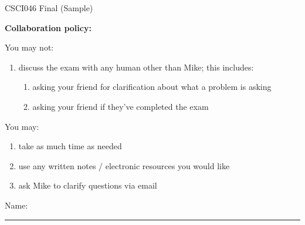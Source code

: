 \documentclass[12pt]{exam}
\theoremstyle{definition}
\begin{document}
\begin{center}
    {
\Large
    CSCI046 Final (Sample)
}


    \vspace{0.1in}
\end{center}

\noindent
\textbf{Collaboration policy:} 

\vspace{0.1in}
\noindent
You may not:
\begin{enumerate}
    \item discuss the exam with any human other than Mike; this includes:
        \begin{enumerate}
            \item asking your friend for clarification about what a problem is asking
            \item asking your friend if they've completed the exam
        \end{enumerate}
\end{enumerate}

\noindent
You may:
\begin{enumerate}
    \item take as much time as needed
    \item use any written notes / electronic resources you would like
    \item ask Mike to clarify questions via email
\end{enumerate}


\vspace{0.15in}

\vspace{0.25in}
\noindent
Name: 

\noindent
\rule{\textwidth}{0.1pt}
\vspace{0.15in}
\end{document}

